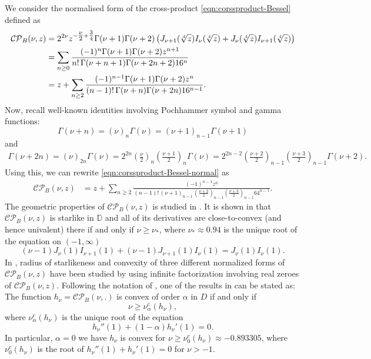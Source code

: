 \documentclass[a4paper,11pt,reqno]{amsart}
\newtheorem{lemma}{Lemma}
\begin{document}
We consider the normalised form of the cross-product \eqref{eqn:corssproduct-Bessel} defined as 
\begin{align}\label{eqn:corssproduct-Bessel-normal}\notag
 \mathcal{CP}_{B}(\nu, z)&= 2^{2\nu} z^{-\tfrac{\nu}{2}+\tfrac{3}{4}} \Gamma(\nu + 1) \Gamma(\nu + 2) \left( J_{\nu+1}(\sqrt[4]{z}) I_\nu(\sqrt[4]{z}) + J_\nu(\sqrt[4]{z}) I_{\nu+1}(\sqrt[4]{z})\right) \\\notag
 &  = \sum_{n \geq 0} \frac{(-1)^n \Gamma(\nu + 1) \Gamma(\nu + 2) z^{n+1}}{n! \, \Gamma(\nu + n + 1)\Gamma(\nu + 2n + 2) 16^n}\\
 &= z+ \sum_{n \geq 2} \frac{(-1)^{n-1} \Gamma(\nu + 1) \Gamma(\nu + 2) z^{n}}{(n-1)! \, \Gamma(\nu + n )\Gamma(\nu + 2n ) 16^{n-1}}. 
\end{align}
Now, recall well-known identities involving Pochhammer symbol and gamma functions: 
\[\Gamma(\nu+n)= (\nu)_n\Gamma(\nu)=(\nu+1)_{n-1}\Gamma(\nu+1)\] 
and 
\begin{align}
\Gamma(\nu+2n)= (\nu)_{2n}\Gamma(\nu) =   2^{2n} \left(\tfrac{\nu}{2}\right)_n \left(\tfrac{\nu+1}{2}\right)_n \Gamma(\nu)=2^{2n-2} \left(\tfrac{\nu+2}{2}\right)_{n-1} \left(\tfrac{\nu+3}{2}\right)_{n-1} \Gamma(\nu+2). 
\end{align}
Using this, we can rewrite \eqref{eqn:corssproduct-Bessel-normal} as 
\begin{align}\label{eqn:corssproduct-Bessel-normal1}
 \mathcal{CP}_{B}(\nu, z)
 &= z+ \sum_{n \geq 2} \frac{(-1)^{n-1}  z^{n}}{(n-1)!\, \left(\nu+1\right)_{n-1} \, \left(\frac{\nu+2}{2}\right)_{n-1} \left(\frac{\nu+3}{2}\right)_{n-1} 64^{n-1}}. 
\end{align}
The geometric properties of $\mathcal{CP}_{B}(\nu, z)$ is studied in \cite{Al-Kharsani-Bessel-prod,Baricz-product-Bessel,Baricz-CP-Bessel}. It is shown in \cite{Al-Kharsani-Bessel-prod} that $\mathcal{CP}_{B}(\nu, z)$ is starlike in $\mathbb{D}$ and all of its derivatives are close-to-convex (and hence univalent) there if and only if $\nu \ge \nu_\ast$, where $\nu_\ast \approx 0.94$ is the unique root of the equation on $(-1,\infty)$
\[
(\nu - 1) J_{\nu}(1) I_{\nu+1}(1)
+ (\nu - 1) J_{\nu+1}(1) I_{\nu}(1)
= J_{\nu}(1) I_{\nu}(1).
\]
In  \cite{Baricz-product-Bessel,Baricz-CP-Bessel}, radius of starlikeness and convexity of three different normalized forms of $\mathcal{CP}_{B}(\nu, z)$ have been studied by using infinite factorization involving real zeroes of $\mathcal{CP}_{B}(\nu, z)$. Following the notation of \cite{Baricz-product-Bessel}, one of the results in \cite{Baricz-product-Bessel} can be stated as: 
 The function $h_{\nu}=\mathcal{CP}_{B}(\nu, .)$ is convex of order $\alpha$ in $D$ if and only if 
\[
\nu \geq \nu^{c}_{\alpha}(h_{\nu}),
\]
where $\nu^{c}_{\alpha}(h_{\nu})$ is the unique root of the equation 
\[
h_{\nu}''(1) + (1 - \alpha) h_{\nu}'(1) = 0.
\]   
In particular, $\alpha=0$ we have $h_{\nu}$ is convex for $\nu \geq \nu^{c}_{0}  (h_{\nu}) \approx -0.893305$, where $\nu^{c}_{0}  (h_{\nu})$ is the root of  $h_{\nu}''(1) +  h_{\nu}'(1) = 0$ for $\nu>-1$. 
\end{document}
